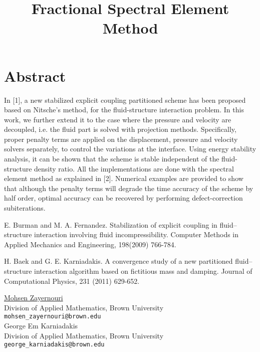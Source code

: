 \documentclass[article,A4,11pt]{llncs}%
\begin{document}
\section*{Abstract}
In [1], a new stabilized explicit coupling partitioned scheme has been proposed based on Nitsche's method, for the fluid-structure interaction problem. In this work, we further extend it to the case where the pressure and velocity are decoupled, i.e. the fluid part is solved with projection methods. Specifically, proper penalty terms are applied on the displacement, pressure and velocity solvers separately, to control the variations at the interface. Using energy stability analysis, it can be shown that the scheme is stable independent of the fluid-structure density ratio. All the implementations are done with the spectral element method as explained in [2]. Numerical examples are provided to show that although the penalty terms will degrade the time accuracy of the scheme by half order, optimal accuracy can be recovered by performing defect-correction subiterations.


\begin{thebibliography}{10}
{\sc E. Burman and M. A. Fernandez}. {Stabilization of explicit coupling in fluid–structure interaction involving fluid incompressibility}. Computer Methods in Applied Mechanics and Engineering, 198(2009) 766-784.

{\sc H. Baek and G. E. Karniadakis}. {A convergence study of a new partitioned fluid–structure interaction algorithm based on fictitious mass and damping}. Journal of Computational Physics, 231 (2011) 629-652.
\end{thebibliography}

\title{Fractional Spectral Element Method}
 \author{} \institute{}
\maketitle
\begin{center}
{\large \underline{Mohsen Zayernouri}}\\
Division of Applied Mathematics, Brown University\\
{\tt mohsen\_zayernouri@brown.edu}
\\ \vspace{4mm}
{\large George  Em Karniadakis}\\
Division of Applied Mathematics, Brown University\\
{\tt george\_karniadakis@brown.edu}
\end{center}
\end{document}
